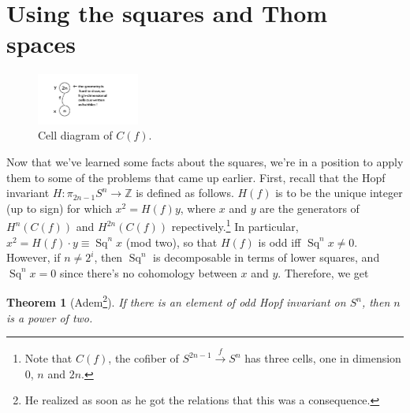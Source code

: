 \documentclass{article}
\providecommand{\OutputUsingTheSquaresAndThomSpaces}{9}
\newcommand{\Z}{\mathbb{Z}}
\newcommand{\onto}{\twoheadrightarrow}
\DeclareMathOperator{\Sq}{Sq}
\newtheorem{thm}{Theorem}[section]
\begin{document}
\section{Using the squares and Thom spaces} %
\label{UsingTheSquaresAndThomSpaces}
\ifx\OutputUsingTheSquaresAndThomSpaces\undefined\else

\begin{figure}
\centering\includegraphics[width=0.3\textwidth]{figures/11.pdf}
\caption{\small Cell diagram of $C(f)$.}
\end{figure}
Now that we've learned some facts about the squares, we're in a position to apply them to some of the problems that came up earlier.  First, recall that the Hopf invariant $H: \pi_{2n-1} S^n \to \Z$ is defined as follows. $H(f)$ is to be the unique integer (up to sign) for which $x^2=H(f)y$, where $x$ and $y$ are the generators of $H^n(C(f))$ and $H^{2n}(C(f))$ repectively.\footnote{Note that $C(f)$, the cofiber of $S^{2n-1} \stackrel{f}{\to} S^n$ has three cells, one in dimension $0$, $n$ and $2n$.} In particular, $x^2 = H(f) \cdot y \equiv \Sq^n x$ (mod two), so that $H(f)$ is odd iff $\Sq^nx\neq0$.  However, if $n \ne 2^i$, then $\Sq^n$ is decomposable in terms of lower squares, and $\Sq^n x = 0$ since there's no cohomology between $x$ and $y$.  Therefore, we get
\begin{thm}[Adem\footnote{He realized as soon as he got the relations that this was a consequence.}]
If there is an element of odd Hopf invariant on $S^n$, then $n$ is a power of two.
\end{thm}
\end{document}

